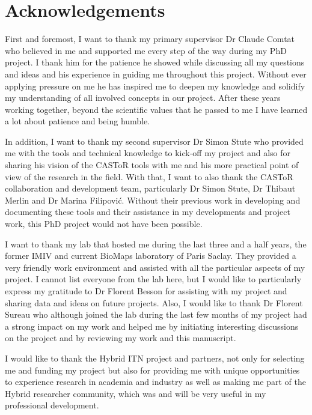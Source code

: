 \chapter*{Acknowledgements}

First and foremost, I want to thank my primary supervisor Dr Claude Comtat who believed in me and supported me every step of the way during my PhD project. I thank him for the patience he showed while discussing all my questions and ideas and his experience in guiding me throughout this project. Without ever applying pressure on me he has inspired me to deepen my knowledge and solidify my understanding of all involved concepts in our project.
 After these years working together, beyond the scientific values that he passed to me I have learned a lot about patience and being humble.

In addition, I want to thank my second supervisor Dr Simon Stute who provided me with the tools and technical knowledge to kick-off my project and also for sharing his vision of the CASToR tools with me and his more practical point of view of the research in the field.
With that, I want to also thank the CASToR collaboration and development team, particularly Dr Simon Stute, Dr Thibaut Merlin and Dr Marina Filipović. Without their previous work in developing and documenting these tools and their assistance in my developments and project work, this PhD project would not have been possible.

I want to thank my lab that hosted me during the last three and a half years, the former IMIV and current BioMaps laboratory of Paris Saclay. They provided a very friendly work environment and assisted with all the particular aspects of my project. I cannot list everyone from the lab here, but I would like to particularly express my gratitude to Dr Florent Besson for assisting with my project and sharing data and ideas on future projects. Also, I would like to thank Dr Florent Sureau who although joined the lab during the last few months of my project had a strong impact on my work and helped me by initiating interesting discussions on the project and by reviewing my work and this manuscript.

I would like to thank the Hybrid ITN project and partners, not only for selecting me and funding my project but also for providing me with unique opportunities to experience research in academia and industry as well as making me part of the Hybrid researcher community, which was and will be very useful in my professional development.

